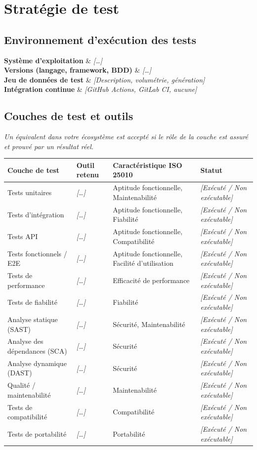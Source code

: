 \documentclass[11pt,a4paper]{article}
\newcommand{\ph}[1]{\textit{[#1]}}
\newcommand{\guide}[1]{\par{\small\itshape #1}\par\medskip}
\newcommand{\ok}{\textit{[Ex\'ecut\'e / Non ex\'ecutable]}}
\newenvironment{kv}{\par\noindent\tabularx{\textwidth}{|L{4.2cm}|Y|}\hline}{\endtabularx\par\medskip}
\newcommand{\row}[2]{\textbf{#1} & #2 \\ \hline}
\begin{document}
\newpage
\section{Strat\'egie de test}
\subsection{Environnement d'ex\'ecution des tests}
\begin{kv}
\row{Syst\`eme d'exploitation}{\ph{\dots}}
\row{Versions (langage, framework, BDD)}{\ph{\dots}}
\row{Jeu de donn\'ees de test}{\ph{Description, volum\'etrie, g\'en\'eration}}
\row{Int\'egration continue}{\ph{GitHub Actions, GitLab CI, aucune}}
\end{kv}

\subsection{Couches de test et outils}
\guide{Un \'equivalent dans votre \'ecosyst\`eme est accept\'e si le r\^ole de la couche est assur\'e et prouv\'e par un r\'esultat r\'eel.}
\noindent\begin{tabularx}{\textwidth}{|L{3.6cm}|L{2.8cm}|Y|L{3cm}|}\hline
\textbf{Couche de test} & \textbf{Outil retenu} & \textbf{Caract\'eristique ISO 25010} & \textbf{Statut} \\ \hline
Tests unitaires & \ph{\dots} & Aptitude fonctionnelle, Maintenabilit\'e & \ok \\ \hline
Tests d'int\'egration & \ph{\dots} & Aptitude fonctionnelle, Fiabilit\'e & \ok \\ \hline
Tests API & \ph{\dots} & Aptitude fonctionnelle, Compatibilit\'e & \ok \\ \hline
Tests fonctionnels / E2E & \ph{\dots} & Aptitude fonctionnelle, Facilit\'e d'utilisation & \ok \\ \hline
Tests de performance & \ph{\dots} & Efficacit\'e de performance & \ok \\ \hline
Tests de fiabilit\'e & \ph{\dots} & Fiabilit\'e & \ok \\ \hline
Analyse statique (SAST) & \ph{\dots} & S\'ecurit\'e, Maintenabilit\'e & \ok \\ \hline
Analyse des d\'ependances (SCA) & \ph{\dots} & S\'ecurit\'e & \ok \\ \hline
Analyse dynamique (DAST) & \ph{\dots} & S\'ecurit\'e & \ok \\ \hline
Qualit\'e / maintenabilit\'e & \ph{\dots} & Maintenabilit\'e & \ok \\ \hline
Tests de compatibilit\'e & \ph{\dots} & Compatibilit\'e & \ok \\ \hline
Tests de portabilit\'e & \ph{\dots} & Portabilit\'e & \ok \\ \hline
\end{tabularx}
\end{document}
